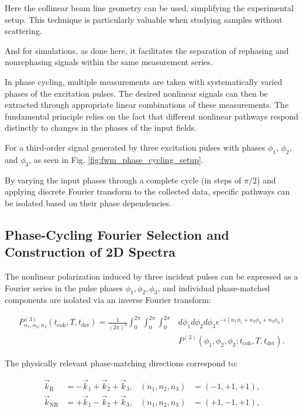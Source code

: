 \noindent 
Here the collinear beam line geometry can be used, simplifying the experimental setup.
This technique is particularly valuable when studying samples without scattering.

\noindent 
And for simulations, as done here, it facilitates the separation of rephasing and nonrephasing signals within the same measurement series.

\noindent 
In phase cycling, multiple measurements are taken with systematically varied phases of the excitation pulses. The desired nonlinear signals can then be extracted through appropriate linear combinations of these measurements. The fundamental principle relies on the fact that different nonlinear pathways respond distinctly to changes in the phases of the input fields.

\noindent 
For a third-order signal generated by three excitation pulses with phases $\phi_1$, $\phi_2$, and $\phi_3$, as seen in Fig. \ref{fig:fwm_phase_cycling_setup}.

\noindent 
By varying the input phases through a complete cycle (in steps of $\pi/2$) and applying discrete Fourier transform to the collected data, specific pathways can be isolated based on their phase dependencies.


\subsection{Phase-Cycling Fourier Selection and Construction of 2D Spectra}
\label{subsec:phase_cycling_fourier_selection}


\noindent 
The nonlinear polarization induced by three incident pulses can be expressed as a Fourier series in the pulse phases $\phi_1, \phi_2, \phi_3$, and individual phase-matched components are isolated via an inverse Fourier transform:

\begin{align}
	P^{(3)}_{n_1,n_2,n_3}(t_{\text{coh}},T,t_{\text{det}}) =
	\frac{1}{(2\pi)^3} \int_{0}^{2\pi}	\int_{0}^{2\pi} \int_{0}^{2\pi}  
	& d\phi_1 d\phi_2 d\phi_3
	e^{-i(n_1\phi_1+n_2\phi_2+n_3\phi_3)} \\
	& P^{(3)}(\phi_1,\phi_2,\phi_3;t_{\text{coh}},T,t_{\text{det}}).
	\label{eq:continuous_phase_cycling}
\end{align}

\noindent 
The physically relevant phase-matching directions correspond to:

\begin{align}
	\vec{k}_{\mathrm{R}}  & = -\vec{k}_1 + \vec{k}_2 + \vec{k}_3,
	                      & (n_1,n_2,n_3)                         & = (-1,+1,+1), \label{eq:rephasing_selection}    \\
	\vec{k}_{\mathrm{NR}} & = +\vec{k}_1 - \vec{k}_2 + \vec{k}_3,
	                      & (n_1,n_2,n_3)                         & = (+1,-1,+1), \label{eq:nonrephasing_selection}
\end{align}

